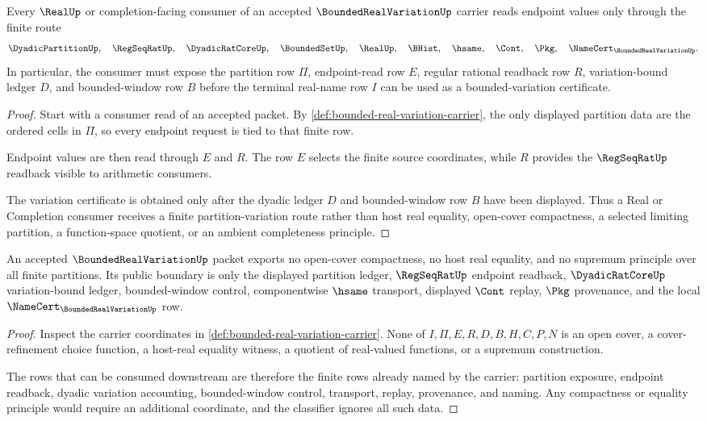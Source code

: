 \begin{theorem}
\label{thm:bounded-real-variation-regseqrat-handoff}
Every $\RealUp$ or completion-facing consumer of an accepted $\BoundedRealVariationUp$ carrier reads endpoint values only through the finite route
$$
\DyadicPartitionUp,\quad
\RegSeqRatUp,\quad
\DyadicRatCoreUp,\quad
\BoundedSetUp,\quad
\RealUp,\quad
\BHist,\quad
\hsame,\quad
\Cont,\quad
\Pkg,\quad
\NameCert_{\BoundedRealVariationUp}.
$$
In particular, the consumer must expose the partition row $\Pi$, endpoint-read row $E$, regular rational readback row $R$, variation-bound ledger $D$, and bounded-window row $B$ before the terminal real-name row $I$ can be used as a bounded-variation certificate.
\end{theorem}
\begin{proof}
Start with a consumer read of an accepted packet. By \autoref{def:bounded-real-variation-carrier}, the only displayed partition data are the ordered cells in $\Pi$, so every endpoint request is tied to that finite row.

Endpoint values are then read through $E$ and $R$. The row $E$ selects the finite source coordinates, while $R$ provides the $\RegSeqRatUp$ readback visible to arithmetic consumers.

The variation certificate is obtained only after the dyadic ledger $D$ and bounded-window row $B$ have been displayed. Thus a Real or Completion consumer receives a finite partition-variation route rather than host real equality, open-cover compactness, a selected limiting partition, a function-space quotient, or an ambient completeness principle.
\end{proof}

\begin{theorem}
\label{thm:bounded-real-variation-compactness-refusal}
An accepted $\BoundedRealVariationUp$ packet exports no open-cover compactness, no host real equality, and no supremum principle over all finite partitions. Its public boundary is only the displayed partition ledger, $\RegSeqRatUp$ endpoint readback, $\DyadicRatCoreUp$ variation-bound ledger, bounded-window control, componentwise $\hsame$ transport, displayed $\Cont$ replay, $\Pkg$ provenance, and the local $\NameCert_{\BoundedRealVariationUp}$ row.
\end{theorem}
\begin{proof}
Inspect the carrier coordinates in \autoref{def:bounded-real-variation-carrier}. None of $I,\Pi,E,R,D,B,H,C,P,N$ is an open cover, a cover-refinement choice function, a host-real equality witness, a quotient of real-valued functions, or a supremum construction.

The rows that can be consumed downstream are therefore the finite rows already named by the carrier: partition exposure, endpoint readback, dyadic variation accounting, bounded-window control, transport, replay, provenance, and naming. Any compactness or equality principle would require an additional coordinate, and the classifier ignores all such data.
\end{proof}

